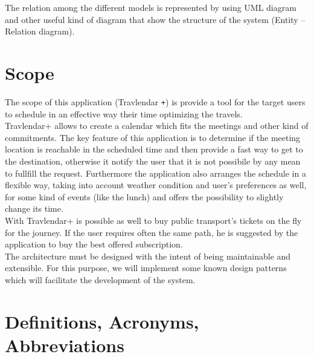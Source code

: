 \documentclass[numbers=noenddot, 12pt, a4paper, oneside]{scrbook}
\def\Plus{\texttt{+}}
\begin{document}
The relation among the different models is represented by using UML diagram and other useful
kind of diagram that show the structure of the system (Entity – Relation diagram).



\section{Scope}

The scope of this application (Travlendar \Plus) is provide a tool for the target users to schedule in an effective way their time optimizing the travels.\\

Travlendar+ allows to create a calendar which fits the meetings and other kind of commitments.
The key feature of this application is to determine if the meeting location is reachable in the scheduled time and then provide a fast way to get to the destination, otherwise it notify the user that it is not possibile by any mean to fullfill the request. Furthermore the application also arranges the schedule in a flexible way, taking into account weather condition and user's preferences as well, for some kind of events (like the lunch) and offers the possibility to slightly change its time.\\

With Travlendar+ is possible as well to buy public transport's tickets on the fly for the journey. If the user requires often the same path, he is suggested by the application to buy the best offered subscription.\\

The architecture must be designed with the intent of being maintainable and extensible. For this purpose, we will implement some known design patterns which will facilitate the development of the system.



\section{Definitions, Acronyms, Abbreviations}
\end{document}

